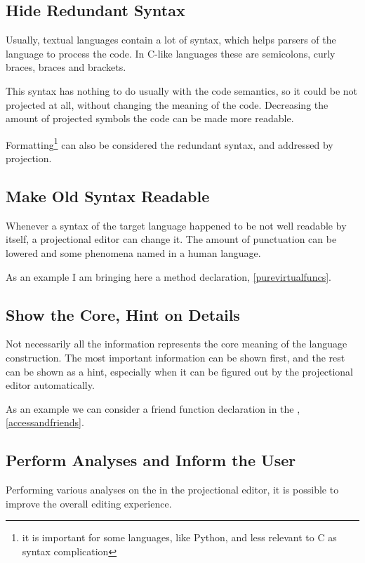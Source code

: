 \subsection{Hide Redundant Syntax}

 Usually, textual languages contain a lot of syntax, which helps parsers of the language to process the code. 
 In C-like languages these are semicolons, curly braces, braces and brackets.
 
 This syntax has nothing to do usually with the code semantics, so it could be not projected at all, without changing
 the meaning of the code. Decreasing the amount of projected symbols the code can be made more readable.
 
 Formatting\footnote{it is important for some languages, like Python, and less relevant to C as syntax complication} can also be considered the redundant syntax, and addressed by projection.

\subsection{Make Old Syntax Readable}

  Whenever a syntax of the target language happened to be not well readable by itself, a projectional editor can 
  change it. The amount of punctuation can be lowered and some phenomena named in a human language.
  
  As an example I am bringing here a  method declaration, \ref{purevirtualfuncs}.

\subsection{Show the Core, Hint on Details}

  Not necessarily all the information represents the core meaning of the language construction. The 
  most important information can be shown first, and the rest can be shown as a hint, especially when
  it can be figured out by the projectional editor automatically.
  
  As an example we can consider a friend function declaration in the \pcpp, \ref{accessandfriends}.

\subsection{Perform Analyses and Inform the User}

Performing various analyses on the  in the projectional editor, it is possible to improve the overall 
editing experience.

